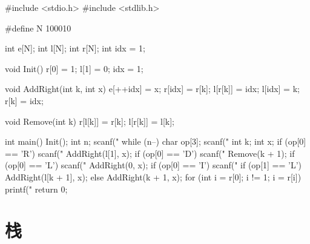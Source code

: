 \begin{mycpptwocol}[双链表]
#include <stdio.h>
#include <stdlib.h>

#define N 100010

int e[N];
int l[N];
int r[N];
int idx = 1;

void Init()
{
    r[0] = 1;
    l[1] = 0;
    idx = 1;
}

void AddRight(int k, int x)
{
    e[++idx] = x;
    r[idx] = r[k];
    l[r[k]] = idx;
    l[idx] = k;
    r[k] = idx;
}

void Remove(int k)
{
    r[l[k]] = r[k];
    l[r[k]] = l[k];
}

int main()
{
    Init();
    int n;
    scanf("%
    while (n--) {
        char op[3];
        scanf("%
        int k;
        int x;
        if (op[0] == 'R') {
            scanf("%
            AddRight(l[1], x);
        }
        if (op[0] == 'D') {
            scanf("%
            Remove(k + 1);
        }
        if (op[0] == 'L') {
            scanf("%
            AddRight(0, x);
        }
        if (op[0] == 'I') {
            scanf("%
            if (op[1] == 'L') {
                AddRight(l[k + 1], x);
            } else {
                AddRight(k + 1, x);
            }
        }
    }
    for (int i = r[0]; i != 1; i = r[i]) {
        printf("%
    }
    return 0;
}
\end{mycpptwocol}

\section{栈}
